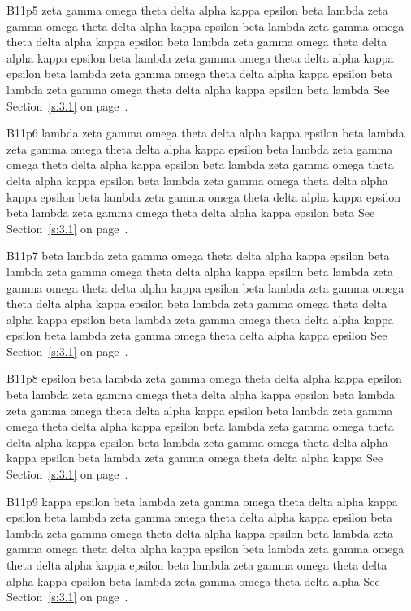 B11p5 zeta gamma omega theta delta alpha kappa epsilon beta lambda zeta gamma omega theta delta alpha kappa epsilon beta lambda zeta gamma omega theta delta alpha kappa epsilon beta lambda zeta gamma omega theta delta alpha kappa epsilon beta lambda zeta gamma omega theta delta alpha kappa epsilon beta lambda zeta gamma omega theta delta alpha kappa epsilon beta lambda zeta gamma omega theta delta alpha kappa epsilon beta lambda See Section~\ref{s:3.1} on page~\pageref{s:3.1}.

B11p6 lambda zeta gamma omega theta delta alpha kappa epsilon beta lambda zeta gamma omega theta delta alpha kappa epsilon beta lambda zeta gamma omega theta delta alpha kappa epsilon beta lambda zeta gamma omega theta delta alpha kappa epsilon beta lambda zeta gamma omega theta delta alpha kappa epsilon beta lambda zeta gamma omega theta delta alpha kappa epsilon beta lambda zeta gamma omega theta delta alpha kappa epsilon beta See Section~\ref{s:3.1} on page~\pageref{s:3.1}.

B11p7 beta lambda zeta gamma omega theta delta alpha kappa epsilon beta lambda zeta gamma omega theta delta alpha kappa epsilon beta lambda zeta gamma omega theta delta alpha kappa epsilon beta lambda zeta gamma omega theta delta alpha kappa epsilon beta lambda zeta gamma omega theta delta alpha kappa epsilon beta lambda zeta gamma omega theta delta alpha kappa epsilon beta lambda zeta gamma omega theta delta alpha kappa epsilon See Section~\ref{s:3.1} on page~\pageref{s:3.1}.

B11p8 epsilon beta lambda zeta gamma omega theta delta alpha kappa epsilon beta lambda zeta gamma omega theta delta alpha kappa epsilon beta lambda zeta gamma omega theta delta alpha kappa epsilon beta lambda zeta gamma omega theta delta alpha kappa epsilon beta lambda zeta gamma omega theta delta alpha kappa epsilon beta lambda zeta gamma omega theta delta alpha kappa epsilon beta lambda zeta gamma omega theta delta alpha kappa See Section~\ref{s:3.1} on page~\pageref{s:3.1}.

B11p9 kappa epsilon beta lambda zeta gamma omega theta delta alpha kappa epsilon beta lambda zeta gamma omega theta delta alpha kappa epsilon beta lambda zeta gamma omega theta delta alpha kappa epsilon beta lambda zeta gamma omega theta delta alpha kappa epsilon beta lambda zeta gamma omega theta delta alpha kappa epsilon beta lambda zeta gamma omega theta delta alpha kappa epsilon beta lambda zeta gamma omega theta delta alpha See Section~\ref{s:3.1} on page~\pageref{s:3.1}.

